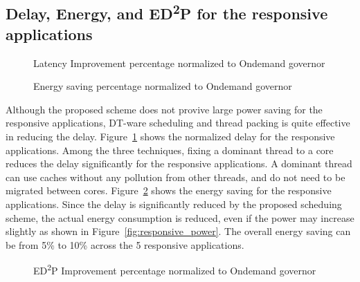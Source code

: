 \subsection{Delay, Energy, and ED\textsuperscript{2}P for the responsive applications}

\begin{figure}[bt]
\begin{center}
\end{center}
\caption{Latency Improvement percentage normalized to Ondemand governor}
\label{fig:responsive_latency_result}
\end{figure}

\begin{figure}[bt]
\begin{center}
\end{center}
\caption{Energy saving percentage normalized to Ondemand governor}
\label{fig:responsive_energy_result}
\end{figure}

Although the proposed scheme does not provive large power saving for the responsive applications, DT-ware scheduling and
thread packing is quite effective in reducing the delay. Figure~\ref{fig:responsive_latency_result} shows 
the normalized delay for the responsive applications. Among the three techniques, fixing a dominant thread to
a core reduces the delay significantly for the responsive applications. A dominant thread can use
caches without any pollution from other threads, and do not need to be migrated between cores.
Figure~\ref{fig:responsive_energy_result} shows the energy saving for the responsive applications. 
Since the delay is significantly reduced by the proposed scheduing scheme, the actual energy consumption
is reduced, even if the power may increase slightly as shown in Figure~\ref{fig:responsive_power}.
The overall energy saving can be from 5\% to 10\% across the 5 responsive applications.

\begin{figure}[bt]
\begin{center}
\end{center}
\caption{ED\textsuperscript{2}P Improvement percentage normalized to Ondemand governor}
\label{fig:responsive_EDP_result}
\end{figure}

